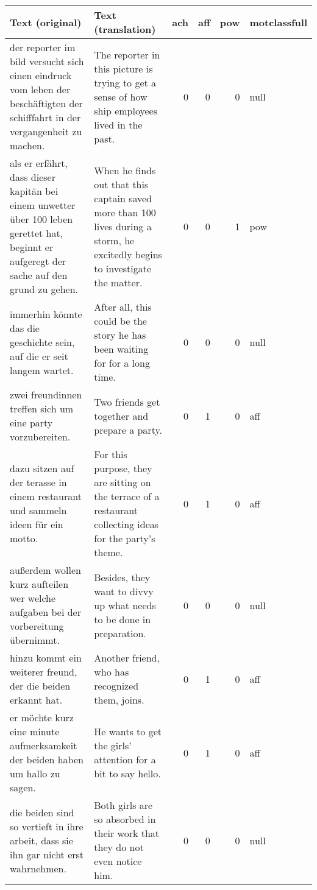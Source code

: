 \documentclass[man,a4paper,mask]{apa6}
\begin{document}
{\begin{table*}
		\caption{Exemplary Sentences and Their Codes for Motive Imagery.}
		\label{tab:dathead}
		\footnotesize
		\begin{tabularx}{\textwidth}{XXrrrl}
		\toprule
		
Text (original) & Text (translation) & ach & aff & pow & motclassfull \\ 
  \hline
der reporter im bild versucht sich einen eindruck vom leben der beschäftigten der schifffahrt in der vergangenheit zu machen. & The reporter in this picture is trying to get a sense of how ship employees lived in the past. &   0 &   0 &   0 & null \\ 
  als er erfährt, dass dieser kapitän bei einem unwetter über 100 leben gerettet hat, beginnt er aufgeregt der sache auf den grund zu gehen. & When he finds out that this captain saved more than 100 lives during a storm, he excitedly begins to investigate the matter. &   0 &   0 &   1 & pow \\ 
  immerhin könnte das die geschichte sein, auf die er seit langem wartet. & After all, this could be the story he has been waiting for for a long time. &   0 &   0 &   0 & null \\ 
  zwei freundinnen treffen sich um eine party vorzubereiten. & Two friends get together and prepare a party. &   0 &   1 &   0 & aff \\ 
  dazu sitzen auf der terasse in einem restaurant und sammeln ideen für ein motto. & For this purpose, they are sitting on the terrace of a restaurant collecting ideas for the party’s theme. &   0 &   1 &   0 & aff \\ 
  außerdem wollen kurz aufteilen wer welche aufgaben bei der vorbereitung übernimmt. & Besides, they want to divvy up what needs to be done in preparation. &   0 &   0 &   0 & null \\ 
  hinzu kommt ein weiterer freund, der die beiden erkannt hat. & Another friend, who has recognized them, joins. &   0 &   1 &   0 & aff \\ 
  er möchte kurz eine minute aufmerksamkeit der beiden haben um hallo zu sagen. & He wants to get the girls’ attention for a bit to say hello. &   0 &   1 &   0 & aff \\ 
  die beiden sind so vertieft in ihre arbeit, dass sie ihn gar nicht erst wahrnehmen. & Both girls are so absorbed in their work that they do not even notice him. &   0 &   0 &   0 & null \\ 

\end{tabularx}
\end{table*}}
\end{document}
